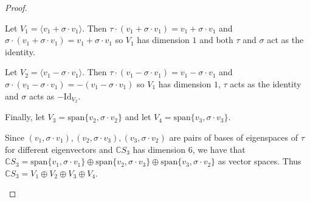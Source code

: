 \documentclass{article}
\begin{document}
\begin{proof}
\begin{enumerate}
Let $V_1=\langle v_1+\sigma\cdot v_1\rangle$. Then $\tau\cdot(v_1+\sigma\cdot v_1)=v_1+\sigma\cdot v_1$ and $\sigma\cdot(v_1+\sigma\cdot v_1)=v_1+\sigma\cdot v_1$ so $V_1$ has dimension $1$ and both $\tau$ and $\sigma$ act as the identity.

Let $V_2=\langle v_1-\sigma\cdot v_1\rangle$. Then $\tau\cdot(v_1-\sigma\cdot v_1)=v_1-\sigma\cdot v_1$ and $\sigma\cdot(v_1-\sigma\cdot v_1)=-(v_1-\sigma\cdot v_1)$ so $V_1$ has dimension $1$, $\tau$ acts as the identity and $\sigma$ acts as $-\text{Id}_{V_2}$.

Finally, let $V_3=\text{span}\{v_2,\sigma\cdot v_2\}$ and let $V_4=\text{span}\{v_3,\sigma\cdot v_3\}$.

Since $(v_1,\sigma\cdot v_1),(v_2,\sigma\cdot v_3),(v_3,\sigma\cdot v_2)$ are pairs of bases of eigenspaces of $\tau$ for different eigenvectors and $\mathbb{C}S_3$ has dimension $6$, we have that $\mathbb{C}S_3=\text{span}\{v_1,\sigma\cdot v_1\}\oplus\text{span}\{v_2,\sigma\cdot v_3\}\oplus\text{span}\{v_3,\sigma\cdot v_2\}$ as vector spaces. Thus $\mathbb{C}S_3=V_1\oplus V_2\oplus V_3\oplus V_4$.
\end{enumerate}
\end{proof}
\end{document}
